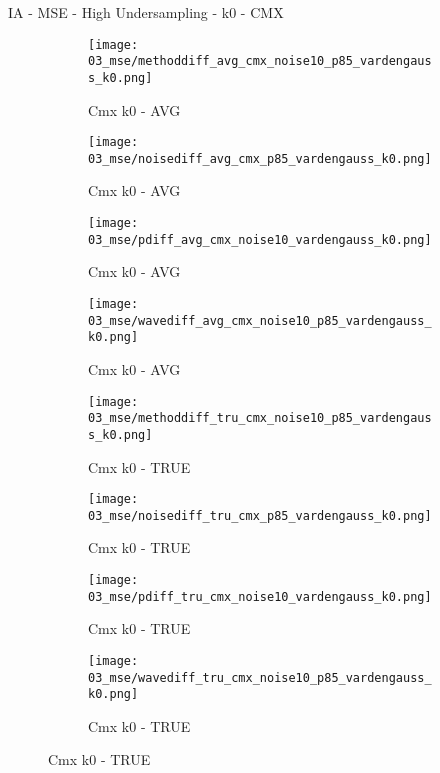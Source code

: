 \documentclass{beamer}
\begin{document}
\begin{frame}{IA - MSE - High Undersampling - k0 - CMX}{}
\begin{figure}
\begin{subfigure}{0.24\textwidth}
\texttt{[image: 03\_mse/methoddiff\_avg\_cmx\_noise10\_p85\_vardengauss\_k0.png]}
\vspace{-20pt}
\caption*{\tiny Cmx k0 - AVG}
\end{subfigure}
\begin{subfigure}{0.24\textwidth}
\texttt{[image: 03\_mse/noisediff\_avg\_cmx\_p85\_vardengauss\_k0.png]}
\vspace{-20pt}
\caption*{\tiny Cmx k0 - AVG}
\end{subfigure}
\begin{subfigure}{0.24\textwidth}
\texttt{[image: 03\_mse/pdiff\_avg\_cmx\_noise10\_vardengauss\_k0.png]}
\vspace{-20pt}
\caption*{\tiny Cmx k0 - AVG}
\end{subfigure}
\begin{subfigure}{0.24\textwidth}
\texttt{[image: 03\_mse/wavediff\_avg\_cmx\_noise10\_p85\_vardengauss\_k0.png]}
\vspace{-20pt}
\caption*{\tiny Cmx k0 - AVG}
\end{subfigure}

\begin{subfigure}{0.24\textwidth}
\texttt{[image: 03\_mse/methoddiff\_tru\_cmx\_noise10\_p85\_vardengauss\_k0.png]}
\vspace{-20pt}
\caption*{\tiny Cmx k0 - TRUE}
\end{subfigure}
\begin{subfigure}{0.24\textwidth}
\texttt{[image: 03\_mse/noisediff\_tru\_cmx\_p85\_vardengauss\_k0.png]}
\vspace{-20pt}
\caption*{\tiny Cmx k0 - TRUE}
\end{subfigure}
\begin{subfigure}{0.24\textwidth}
\texttt{[image: 03\_mse/pdiff\_tru\_cmx\_noise10\_vardengauss\_k0.png]}
\vspace{-20pt}
\caption*{\tiny Cmx k0 - TRUE}
\end{subfigure}
\begin{subfigure}{0.24\textwidth}
\texttt{[image: 03\_mse/wavediff\_tru\_cmx\_noise10\_p85\_vardengauss\_k0.png]}
\vspace{-20pt}
\caption*{\tiny Cmx k0 - TRUE}
\end{subfigure}
\end{figure}
\end{frame}
\end{document}
